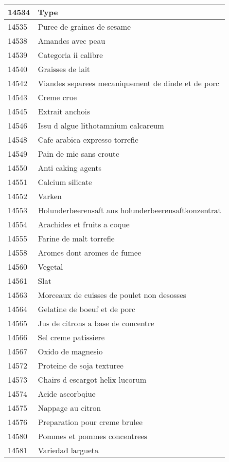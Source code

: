 \begin{longtable}{|l|l|}
14534 & Type \\ \hline 
14535 & Puree de graines de sesame \\ \hline 
14538 & Amandes avec peau \\ \hline 
14539 & Categoria ii calibre \\ \hline 
14540 & Graisses de lait \\ \hline 
14542 & Viandes separees mecaniquement de dinde et de porc \\ \hline 
14543 & Creme crue \\ \hline 
14545 & Extrait anchois \\ \hline 
14546 & Issu d algue lithotamnium calcareum \\ \hline 
14548 & Cafe arabica expresso torrefie \\ \hline 
14549 & Pain de mie sans croute \\ \hline 
14550 & Anti caking agents \\ \hline 
14551 & Calcium silicate \\ \hline 
14552 & Varken \\ \hline 
14553 & Holunderbeerensaft aus holunderbeerensaftkonzentrat \\ \hline 
14554 & Arachides et fruits a coque \\ \hline 
14555 & Farine de malt torrefie \\ \hline 
14558 & Aromes dont aromes de fumee \\ \hline 
14560 & Vegetal \\ \hline 
14561 & Slat \\ \hline 
14563 & Morceaux de cuisses de poulet non desosses \\ \hline 
14564 & Gelatine de boeuf et de porc \\ \hline 
14565 & Jus de citrons a base de concentre \\ \hline 
14566 & Sel creme patissiere \\ \hline 
14567 & Oxido de magnesio \\ \hline 
14572 & Proteine de soja texturee \\ \hline 
14573 & Chairs d escargot helix lucorum \\ \hline 
14574 & Acide ascorbqiue \\ \hline 
14575 & Nappage au citron \\ \hline 
14576 & Preparation pour creme brulee \\ \hline 
14580 & Pommes et pommes concentrees \\ \hline 
14581 & Variedad largueta \\ \hline 

\end{longtable}

